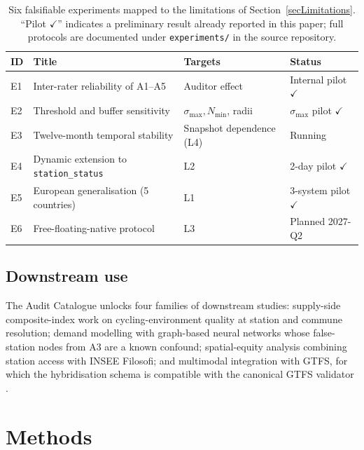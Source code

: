 \documentclass[11pt,a4paper]{article}
\begin{document}
\begin{table}[ht]
\centering
\caption{Six falsifiable experiments mapped to the limitations of
Section~\ref{secLimitations}. ``Pilot $\checkmark$'' indicates a
preliminary result already reported in this paper; full protocols are
documented under \texttt{experiments/} in the source repository.}
\label{tab:roadmap}
\small
\begin{tabular}{@{}llll@{}}
\toprule
\textbf{ID} & \textbf{Title} & \textbf{Targets} & \textbf{Status}\\
\midrule
E1 & Inter-rater reliability of A1--A5         & Auditor effect             & Internal pilot $\checkmark$ \\
E2 & Threshold and buffer sensitivity           & $\sigma_{\max}, N_{\min}$, radii & $\sigma_{\max}$ pilot $\checkmark$ \\
E3 & Twelve-month temporal stability            & Snapshot dependence (L4)    & Running \\
E4 & Dynamic extension to \texttt{station\_status} & L2                       & 2-day pilot $\checkmark$ \\
E5 & European generalisation (5 countries)      & L1                          & 3-system pilot $\checkmark$ \\
E6 & Free-floating-native protocol              & L3                          & Planned 2027-Q2 \\
\bottomrule
\end{tabular}
\end{table}

\subsection{Downstream use}
The Audit Catalogue unlocks four families of downstream studies:
supply-side composite-index work on cycling-environment quality at
station and commune resolution; demand modelling with graph-based
neural networks \cite{Lin2018BSSGraph} whose false-station nodes
from A3 are a known confound; spatial-equity analysis combining
station access with INSEE Filosofi; and multimodal integration with
GTFS, for which the hybridisation schema is compatible with the
canonical GTFS validator \cite{MobilityData2024Validator}.

\section{Methods}\label{secMethods}
\end{document}

